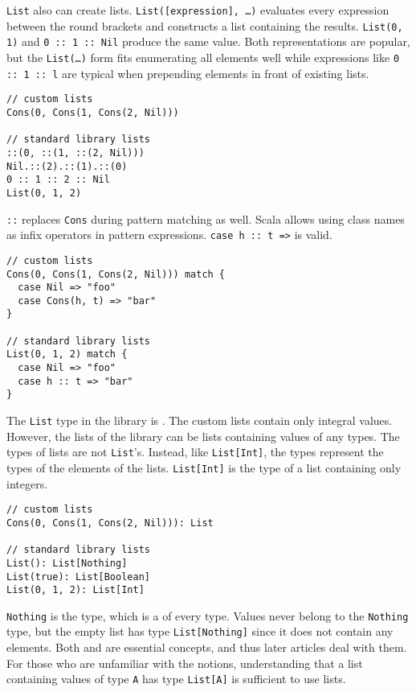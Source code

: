 \verb!List! also can create lists. \verb!List([expression], …)! evaluates every
expression between the round brackets and constructs a list containing the
results. \verb!List(0, 1)! and \verb!0 :: 1 :: Nil! produce the same value. Both
representations are popular, but the \verb!List(…)! form fits enumerating all
elements well while expressions like \verb!0 :: 1 :: l! are typical when
prepending elements in front of existing lists.

\begin{verbatim}
// custom lists
Cons(0, Cons(1, Cons(2, Nil)))

// standard library lists
::(0, ::(1, ::(2, Nil)))
Nil.::(2).::(1).::(0)
0 :: 1 :: 2 :: Nil
List(0, 1, 2)
\end{verbatim}

\verb!::! replaces \verb!Cons! during pattern matching as well. Scala allows
using class names as infix operators in pattern expressions. \verb!case h :: t =>!
is valid.

\begin{verbatim}
// custom lists
Cons(0, Cons(1, Cons(2, Nil))) match {
  case Nil => "foo"
  case Cons(h, t) => "bar"
}

// standard library lists
List(0, 1, 2) match {
  case Nil => "foo"
  case h :: t => "bar"
}
\end{verbatim}

The \verb!List! type in the library is . The custom lists
contain only integral values. However, the lists of the library can be lists
containing values of any types. The types of lists are not \verb!List!'s.
Instead, like \verb!List[Int]!, the types represent the types of the elements of
the lists. \verb!List[Int]! is the type of a list containing only integers.

\begin{verbatim}
// custom lists
Cons(0, Cons(1, Cons(2, Nil))): List

// standard library lists
List(): List[Nothing]
List(true): List[Boolean]
List(0, 1, 2): List[Int]
\end{verbatim}

\verb!Nothing! is the  type, which is a  of every
type. Values never belong to the \verb!Nothing! type, but the empty list has type
\verb!List[Nothing]! since it does not contain any elements. Both
 and  are essential
concepts, and thus later articles deal with them. For those who are unfamiliar
with the notions, understanding that a list containing values of type \verb!A!
has type \verb!List[A]! is sufficient to use lists.

